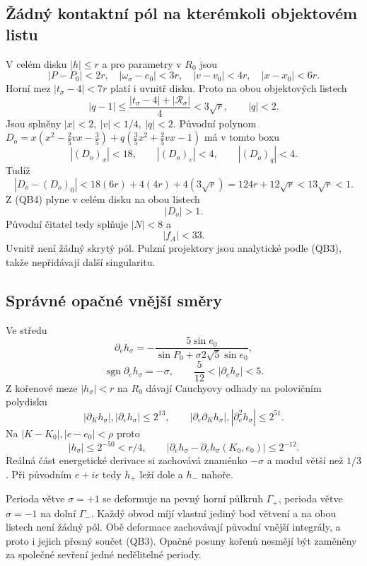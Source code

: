 \documentclass[11pt,a4paper]{article}
\theoremstyle{remark}\newtheorem{remark}[theorem]{Poznámka}
\numberwithin{equation}{section}
\begin{document}
\hypertarget{ux17euxe1dnuxfd-kontaktnuxed-puxf3l-na-kteruxe9mkoli-objektovuxe9m-listu}{%
\subsection{Žádný kontaktní pól na kterémkoli objektovém
listu}\label{ux17euxe1dnuxfd-kontaktnuxed-puxf3l-na-kteruxe9mkoli-objektovuxe9m-listu}}

V celém disku \(|h|\le r\) a pro parametry v \(R_0\) jsou \[
|P-P_0|<2r,\quad |\omega_\sigma-e_0|<3r,\quad
|v-v_0|<4r,\quad |x-x_0|<6r.
\] Horní mez \(|t_\sigma-4|<7r\) platí i uvnitř disku. Proto na obou
objektových listech \[
|q-1|\le\frac{|t_\sigma-4|+|\mathcal R_\sigma|}{4}
<3\sqrt r,\qquad |q|<2.
\tag{QB10}
\] Jsou splněny \(|x|<2,\ |v|<1/4,\ |q|<2\). Původní polynom
\(D_o=x(x^2-\frac25vx-\frac35) +q(\frac35x^2+\frac25vx-1)\) má v tomto
boxu \[
|(D_o)_x|<18,\qquad |(D_o)_v|<4,\qquad |(D_o)_q|<4.
\] Tudíž \[
|D_o-(D_o)_0|<18(6r)+4(4r)+4(3\sqrt r)
=124r+12\sqrt r<13\sqrt r<1.
\] Z (QB4) plyne v celém disku na obou listech \[
\boxed{|D_o|>1.}
\tag{QB11}
\] Původní čitatel tedy splňuje \(|N|<8\) a \[
\boxed{|f_A|<33.}
\tag{QB12}
\] Uvnitř není žádný skrytý pól. Pulzní projektory jsou analytické podle
(QB3), takže nepřidávají další singularitu.

\hypertarget{spruxe1vnuxe9-opaux10dnuxe9-vnux11bjux161uxed-smux11bry}{%
\subsection{Správné opačné vnější
směry}\label{spruxe1vnuxe9-opaux10dnuxe9-vnux11bjux161uxed-smux11bry}}

Ve středu \[
\partial_e h_\sigma
=-\frac{5\sin e_0}{\sin P_0+\sigma2\sqrt5\sin e_0},
\] \[
\operatorname{sgn}\partial_e h_\sigma=-\sigma,\qquad
\frac5{12}<|\partial_e h_\sigma|<5.
\tag{QB13}
\] Z kořenové meze \(|h_\sigma|<r\) na \(R_0\) dávají Cauchyovy odhady
na polovičním polydisku \[
|\partial_Kh_\sigma|,|\partial_eh_\sigma|\le2^{13},
\qquad
|\partial_e\partial_Kh_\sigma|,|\partial_e^2h_\sigma|\le2^{51}.
\] Na \(|K-K_0|,|e-e_0|<\rho\) proto \[
|h_\sigma|\le2^{-50}<r/4,\qquad
|\partial_eh_\sigma-\partial_eh_\sigma(K_0,e_0)|\le2^{-12}.
\tag{QB14}
\] Reálná část energetické derivace si zachovává znaménko \(-\sigma\) a
modul větší než \(1/3\). Při původním \(e+i\epsilon\) tedy \(h_+\) leží
dole a \(h_-\) nahoře.

Perioda větve \(\sigma=+1\) se deformuje na pevný horní půlkruh
\(\Gamma_+\), perioda větve \(\sigma=-1\) na dolní \(\Gamma_-\). Každý
obvod míjí vlastní jediný bod větvení a na obou listech není žádný pól.
Obě deformace zachovávají původní vnější integrály, a proto i jejich
přesný součet (QB3). Opačné posuny kořenů nesmějí být zaměněny za
společné sevření jedné nedělitelné periody.
\end{document}
